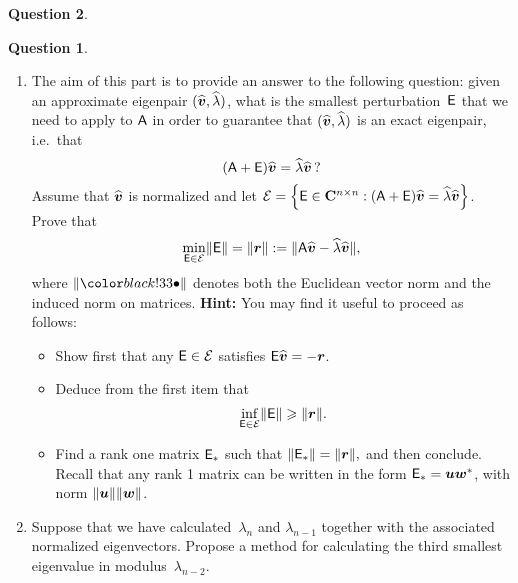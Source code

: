 \documentclass[11pt]{article}
\theoremstyle{definition}
\newtheorem{question}{Question}
\theoremstyle{remark}
\theoremstyle{plain}%
\begin{document}
\begin{question}
\begin{question}
\begin{enumerate}
        \item
            The aim of this part is to provide an answer to the following question:
            given an approximate eigenpair $(\widehat {\mathbf{\boldsymbol{v}}}, \widehat \lambda)$,
            what is the smallest perturbation~$\mathsf E$ that we need to apply to $\mathsf A$ in order to guarantee that
            $(\widehat {\mathbf{\boldsymbol{v}}}, \widehat \lambda)$ is an exact eigenpair, i.e.\ that
            \[
                (\mathsf A + \mathsf E) \widehat {\mathbf{\boldsymbol{v}}} = \widehat \lambda \widehat {\mathbf{\boldsymbol{v}}} \,?
            \]
            Assume that $\widehat {\mathbf{\boldsymbol{v}}}$ is normalized and
            let $\mathcal E = \Bigl\{\mathsf E \in \mathbf C^{n \times n}: (\mathsf A + \mathsf E) \widehat {\mathbf{\boldsymbol{v}}} = \widehat \lambda \widehat {\mathbf{\boldsymbol{v}}} \Bigr\}$.
            Prove that
            \begin{equation}
                \label{eq:kahan_parlett_jiang}
                \min_{\mathsf E \in \mathcal E} \lVert\mathsf E\rVert = \lVert\mathbf{\boldsymbol{r}}\rVert := \lVert\mathsf A \widehat {\mathbf{\boldsymbol{v}}} - \widehat \lambda \widehat {\mathbf{\boldsymbol{v}}}\rVert,
            \end{equation}
            where $\norm{\placeholder}$ denotes both the Euclidean vector norm and the induced norm on matrices.
            \textbf{Hint:} You may find it useful to proceed as follows:
            \begin{itemize}
                \item
                    Show first that any $\mathsf E \in \mathcal E$ satisfies $\mathsf E \widehat {\mathbf{\boldsymbol{v}}} = - \mathbf{\boldsymbol{r}}$.

                \item
                    Deduce from the first item that
                    \[
                        \inf_{\mathsf E \in \mathcal E} \lVert\mathsf E\rVert \geqslant \lVert\mathbf{\boldsymbol{r}}\rVert.
                    \]

                \item
                    Find a rank one matrix $\mathsf E_*$ such that
                    \(
                    \lVert\mathsf E_*\rVert = \lVert\mathbf{\boldsymbol{r}}\rVert,
                    \)
                    and then conclude.
                    Recall that any rank 1 matrix can be written in the form $\mathsf E_* = \mathbf{\boldsymbol{u}} \mathbf{\boldsymbol{w}}^*$,
                    with norm $\lVert\mathbf{\boldsymbol{u}}\rVert \lVert\mathbf{\boldsymbol{w}}\rVert$.
            \end{itemize}

        \item
            Suppose that we have calculated~$\lambda_n$ and $\lambda_{n-1}$ together with the associated normalized eigenvectors.
            Propose a method for calculating the third smallest eigenvalue in modulus~$\lambda_{n-2}$.
    \end{enumerate}
\end{question}




\end{question}
\end{document}
